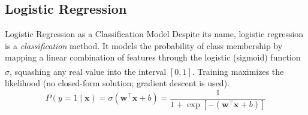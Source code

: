\subsection{Logistic Regression}

\begin{v3topic}{Logistic Regression as a Classification Model}
    Despite its name, logistic regression is a \emph{classification} method. It models the probability of class membership by mapping a linear combination of features through the logistic (sigmoid) function $\sigma$, squashing any real value into the interval $[0, 1]$\textsuperscript{\cite[][pp.~89--90]{iiiCourseMachineLearning}}. Training maximizes the likelihood (no closed-form solution; gradient descent is used).
\visualseparator
    \begin{equation}
        P(y = 1 \mid \mathbf{x}) = \sigma\!\left(\mathbf{w}^\top \mathbf{x} + b\right) = \frac{1}{1 + \exp\!\left[-\!\left(\mathbf{w}^\top \mathbf{x} + b\right)\right]}
    \end{equation}

\end{v3topic}
